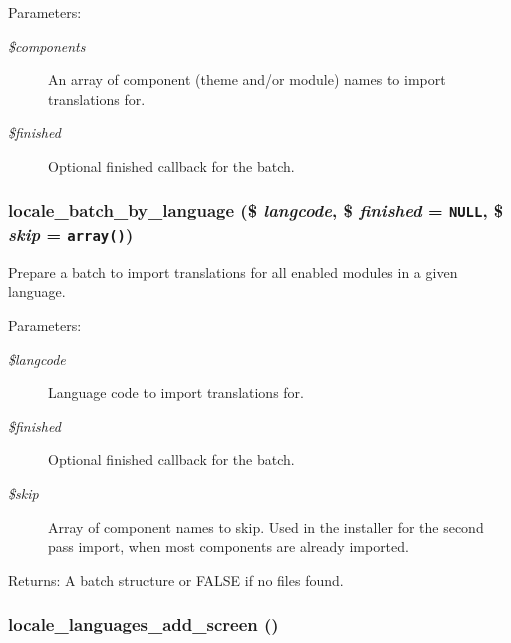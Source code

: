 \begin{Desc}
\item[Parameters:]
\begin{description}
\item[{\em \$components}]An array of component (theme and/or module) names to import translations for. \item[{\em \$finished}]Optional finished callback for the batch. \end{description}
\end{Desc}
\hypertarget{group__locale_g2c34cb914394a45fb4e94561bfc26b71}{
\subsubsection[{locale\_\-batch\_\-by\_\-language}]{\setlength{\rightskip}{0pt plus 5cm}locale\_\-batch\_\-by\_\-language (\$ {\em langcode}, \/  \$ {\em finished} = {\tt NULL}, \/  \$ {\em skip} = {\tt array()})}}
\label{group__locale_g2c34cb914394a45fb4e94561bfc26b71}


Prepare a batch to import translations for all enabled modules in a given language.

\begin{Desc}
\item[Parameters:]
\begin{description}
\item[{\em \$langcode}]Language code to import translations for. \item[{\em \$finished}]Optional finished callback for the batch. \item[{\em \$skip}]Array of component names to skip. Used in the installer for the second pass import, when most components are already imported. \end{description}
\end{Desc}
\begin{Desc}
\item[Returns:]A batch structure or FALSE if no files found. \end{Desc}
\hypertarget{group__locale_g717959709d412fc1039f7436501dbf49}{
\subsubsection[{locale\_\-languages\_\-add\_\-screen}]{\setlength{\rightskip}{0pt plus 5cm}locale\_\-languages\_\-add\_\-screen ()}}
\label{group__locale_g717959709d412fc1039f7436501dbf49}


